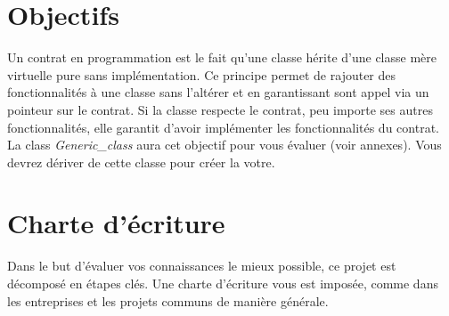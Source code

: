 \documentclass[9pts]{article}
\begin{document}
\section{Objectifs}
Un contrat en programmation est le fait qu'une classe hérite d'une classe mère virtuelle pure sans implémentation.
Ce principe permet de rajouter des fonctionnalités à une classe sans l'altérer et en garantissant sont appel via un pointeur sur le contrat.
Si la classe respecte le contrat, peu importe ses autres fonctionnalités, elle garantit d'avoir implémenter les fonctionnalités du contrat. \\

La class \emph{Generic\_class} aura cet objectif pour vous évaluer (voir annexes).
Vous devrez dériver de cette classe pour créer la votre.


\section{Charte d'écriture}
Dans le but d'évaluer vos connaissances le mieux possible, ce projet est décomposé en étapes clés.
Une charte d'écriture vous est imposée, comme dans les entreprises et les projets communs de manière générale. \\
\end{document}
